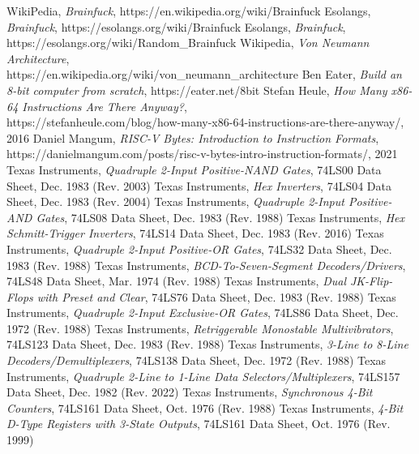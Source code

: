 \begin{thebibliography}{99} \label{resources}
 WikiPedia, \emph{Brainfuck}, https://en.wikipedia.org/wiki/Brainfuck
 Esolangs, \emph{Brainfuck}, https://esolangs.org/wiki/Brainfuck
 Esolangs, \emph{Brainfuck}, https://esolangs.org/wiki/Random\_Brainfuck
 Wikipedia, \emph{Von Neumann Architecture},\\https://en.wikipedia.org/wiki/von\_neumann\_architecture
 Ben Eater, \emph{Build an 8-bit computer from scratch}, https://eater.net/8bit
 Stefan Heule, \emph{How Many x86-64 Instructions Are There Anyway?},\\https://stefanheule.com/blog/how-many-x86-64-instructions-are-there-anyway/, 2016
 Daniel Mangum, \emph{RISC-V Bytes: Introduction to Instruction Formats},\\https://danielmangum.com/posts/risc-v-bytes-intro-instruction-formats/, 2021
 Texas Instruments, \emph{Quadruple 2-Input Positive-NAND Gates}, 74LS00 Data Sheet, Dec. 1983 (Rev. 2003)
 Texas Instruments, \emph{Hex Inverters}, 74LS04 Data Sheet, Dec. 1983 (Rev. 2004)
 Texas Instruments, \emph{Quadruple 2-Input Positive-AND Gates}, 74LS08 Data Sheet, Dec. 1983 (Rev. 1988)
 Texas Instruments, \emph{Hex Schmitt-Trigger Inverters}, 74LS14 Data Sheet, Dec. 1983 (Rev. 2016)
 Texas Instruments, \emph{Quadruple 2-Input Positive-OR Gates}, 74LS32 Data Sheet, Dec. 1983 (Rev. 1988)
 Texas Instruments, \emph{BCD-To-Seven-Segment Decoders/Drivers}, 74LS48 Data Sheet, Mar. 1974 (Rev. 1988)
 Texas Instruments, \emph{Dual JK-Flip-Flops with Preset and Clear}, 74LS76 Data Sheet, Dec. 1983 (Rev. 1988)
 Texas Instruments, \emph{Quadruple 2-Input Exclusive-OR Gates}, 74LS86 Data Sheet, Dec. 1972 (Rev. 1988)
 Texas Instruments, \emph{Retriggerable Monostable Multivibrators}, 74LS123 Data Sheet, Dec. 1983 (Rev. 1988)
 Texas Instruments, \emph{3-Line to 8-Line Decoders/Demultiplexers}, 74LS138 Data Sheet, Dec. 1972 (Rev. 1988)
 Texas Instruments, \emph{Quadruple 2-Line to 1-Line Data Selectors/Multiplexers}, 74LS157 Data Sheet, Dec. 1982 (Rev. 2022)
 Texas Instruments, \emph{Synchronous 4-Bit Counters}, 74LS161 Data Sheet, Oct. 1976 (Rev. 1988)
 Texas Instruments, \emph{4-Bit D-Type Registers with 3-State Outputs}, 74LS161 Data Sheet, Oct. 1976 (Rev. 1999)

\end{thebibliography}
